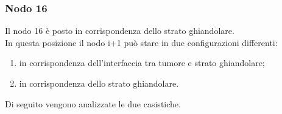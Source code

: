 \subsubsection*{Nodo 16}
Il nodo 16 è posto in corrispondenza dello strato ghiandolare.\\
In questa posizione il nodo i+1 può stare in due configurazioni differenti:
\begin{enumerate}
    \item in corrispondenza dell'interfaccia tra tumore e strato ghiandolare;
    \item in corrispondenza dello strato ghiandolare.
\end{enumerate}
Di seguito vengono analizzate le due casistiche.
